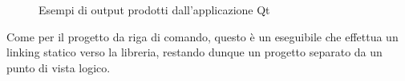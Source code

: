 \begin{figure}%
	\centering
	\qquad
	\caption{Esempi di output prodotti dall'applicazione Qt}%
	\label{fig:ui:output}%
\end{figure}

Come per il progetto da riga di comando, questo è un eseguibile che effettua un linking statico verso la libreria, restando dunque un progetto separato da un punto di vista logico.